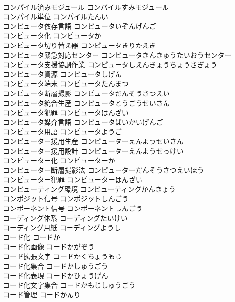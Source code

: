 \documentclass[8pt]{extreport}
\begin{document}
\begin{CJK}{UTF8}{min}
\\	コンパイル済みモジュール	コンパイルすみモジュール	
\\	コンパイル単位	コンパイルたんい	
\\	コンピュータ依存言語	コンピュータいぞんげんご	
\\	コンピュータ化	コンピュータか	
\\	コンピュータ切り替え器	コンピュータきりかえき	
\\	コンピュータ緊急対応センター	コンピュータきんきゅうたいおうセンター	
\\	コンピュータ支援協調作業	コンピュータしえんきょうちょうさぎょう	
\\	コンピュータ資源	コンピュータしげん	
\\	コンピュータ端末	コンピュータたんまつ	
\\	コンピュータ断層撮影	コンピュータだんそうさつえい	
\\	コンピュータ統合生産	コンピュータとうごうせいさん	
\\	コンピュータ犯罪	コンピュータはんざい	
\\	コンピュータ媒介言語	コンピュータばいかいげんご	
\\	コンピュータ用語	コンピュータようご	
\\	コンピューター援用生産	コンピューターえんようせいさん	
\\	コンピューター援用設計	コンピューターえんようせっけい	
\\	コンピューター化	コンピューターか	
\\	コンピューター断層撮影法	コンピューターだんそうさつえいほう	
\\	コンピューター犯罪	コンピューターはんざい	
\\	コンピューティング環境	コンピューティングかんきょう	
\\	コンポジット信号	コンポジットしんごう	
\\	コンポーネント信号	コンポーネントしんごう	
\\	コーディング体系	コーディングたいけい	
\\	コーディング用紙	コーディングようし	
\\	コード化	コードか	
\\	コード化画像	コードかがぞう	
\\	コード拡張文字	コードかくちょうもじ	
\\	コード化集合	コードかしゅうごう	
\\	コード化表現	コードかひょうげん	
\\	コード化文字集合	コードかもじしゅうごう	
\\	コード管理	コードかんり	

\end{CJK}
\end{document}
